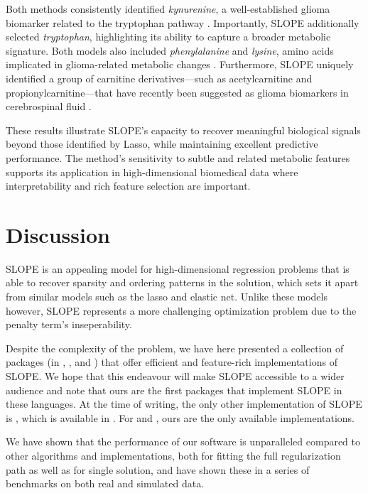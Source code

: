 \documentclass[article]{jss}
\begin{document}
Both methods consistently identified \textit{kynurenine}, a well-established glioma biomarker related to the tryptophan pathway \citep{du2020both}. Importantly, SLOPE additionally selected \textit{tryptophan}, highlighting its ability to capture a broader metabolic signature. Both models also included \textit{phenylalanine} and \textit{lysine}, amino acids implicated in glioma-related metabolic changes \citep{koslinski2023comparative, srivastava2025amino}. Furthermore, SLOPE uniquely identified a group of carnitine derivatives—such as acetylcarnitine and propionylcarnitine—that have recently been suggested as glioma biomarkers in cerebrospinal fluid \citep{wang2024genomic}.

These results illustrate SLOPE’s capacity to recover meaningful biological signals beyond those identified by Lasso, while maintaining excellent predictive performance. The method’s sensitivity to subtle and related metabolic features supports its application in high-dimensional biomedical data where interpretability and rich feature selection are important.







\section{Discussion}\label{sec:discussion}

SLOPE is an appealing model for high-dimensional regression problems that is
able to recover sparsity and ordering patterns in the solution, which sets it
apart from similar models such as the lasso and elastic net. Unlike these models
however, SLOPE represents a more challenging optimization problem due to the
penalty term's inseperability.

Despite the complexity of the problem, we have here presented a collection of
packages (in , , and ) that offer
efficient and feature-rich implementations of SLOPE. We hope that this
endeavour will make SLOPE accessible to a wider audience and note that ours are
the first packages that implement SLOPE in these languages. At the time of
writing, the only other implementation of SLOPE is , which is
available in . For  and , ours are
the only available implementations.

We have shown that the performance of our software is unparalleled
compared to other algorithms and implementations, both for fitting
the full regularization path as well as for single solution, and
have shown these in a series of benchmarks on both real and simulated
data.
\end{document}
